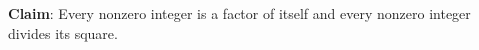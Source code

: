 
{\bf Claim}: Every nonzero integer is a factor of itself and 
every nonzero integer divides its square.

\vspace{250pt}
